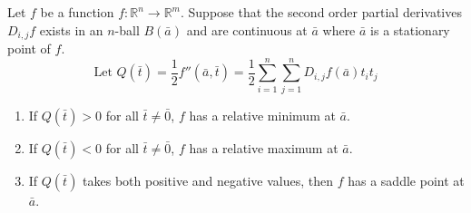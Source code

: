 \begin{theorem}
	Let $f$ be a function $f : \mathbb{R}^n \to \mathbb{R}^m$.
	Suppose that the second order partial derivatives $D_{i,j}f$ exists in an $n$-ball $B(\bar{a})$ and are continuous at $\bar{a}$ where $\bar{a}$ is a stationary point of $f$.
	\[ \text{Let } Q(\bar{t}) = \frac{1}{2} f''(\bar{a},\bar{t}) = \frac{1}{2} \sum_{i = 1}^n \sum_{j = 1}^n D_{i,j} f(\bar{a})t_it_j \]
\begin{enumerate}
	\item If $Q(\bar{t}) > 0$ for all $\bar{t} \ne \bar{0}$, $f$ has a relative minimum at $\bar{a}$.
	\item If $Q(\bar{t}) < 0$ for all $\bar{t} \ne \bar{0}$, $f$ has a relative maximum at $\bar{a}$.
	\item If $Q(\bar{t})$ takes both positive and negative values, then $f$ has a saddle point at $\bar{a}$.
\end{enumerate}
\end{theorem}
